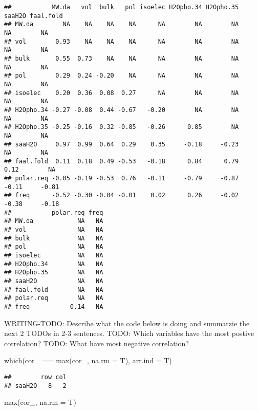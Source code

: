\documentclass[
]{book}
\newenvironment{Shaded}{\begin{snugshade}}{\end{snugshade}}
\newcommand{\AttributeTok}[1]{\textcolor[rgb]{0.77,0.63,0.00}{#1}}
\newcommand{\FunctionTok}[1]{\textcolor[rgb]{0.00,0.00,0.00}{#1}}
\newcommand{\NormalTok}[1]{#1}
\newcommand{\SpecialCharTok}[1]{\textcolor[rgb]{0.00,0.00,0.00}{#1}}
\begin{document}
\begin{verbatim}
##           MW.da   vol  bulk   pol isoelec H2Opho.34 H2Opho.35 saaH2O faal.fold
## MW.da        NA    NA    NA    NA      NA        NA        NA     NA        NA
## vol        0.93    NA    NA    NA      NA        NA        NA     NA        NA
## bulk       0.55  0.73    NA    NA      NA        NA        NA     NA        NA
## pol        0.29  0.24 -0.20    NA      NA        NA        NA     NA        NA
## isoelec    0.20  0.36  0.08  0.27      NA        NA        NA     NA        NA
## H2Opho.34 -0.27 -0.08  0.44 -0.67   -0.20        NA        NA     NA        NA
## H2Opho.35 -0.25 -0.16  0.32 -0.85   -0.26      0.85        NA     NA        NA
## saaH2O     0.97  0.99  0.64  0.29    0.35     -0.18     -0.23     NA        NA
## faal.fold  0.11  0.18  0.49 -0.53   -0.18      0.84      0.79   0.12        NA
## polar.req -0.05 -0.19 -0.53  0.76   -0.11     -0.79     -0.87  -0.11     -0.81
## freq      -0.52 -0.30 -0.04 -0.01    0.02      0.26     -0.02  -0.38     -0.18
##           polar.req freq
## MW.da            NA   NA
## vol              NA   NA
## bulk             NA   NA
## pol              NA   NA
## isoelec          NA   NA
## H2Opho.34        NA   NA
## H2Opho.35        NA   NA
## saaH2O           NA   NA
## faal.fold        NA   NA
## polar.req        NA   NA
## freq           0.14   NA
\end{verbatim}

WRITING-TODO: Describe what the code below is doing and summarzie the next 2 TODOs in 2-3 sentences.
TODO: Which variables have the most postive correlation?
TODO: What have most negative correlation?

\begin{Shaded}
\begin{Highlighting}[]
\FunctionTok{which}\NormalTok{(cor\_ }\SpecialCharTok{==} \FunctionTok{max}\NormalTok{(cor\_, }\AttributeTok{na.rm =}\NormalTok{ T), }\AttributeTok{arr.ind =}\NormalTok{ T)}
\end{Highlighting}
\end{Shaded}

\begin{verbatim}
##        row col
## saaH2O   8   2
\end{verbatim}

\begin{Shaded}
\begin{Highlighting}[]
\FunctionTok{max}\NormalTok{(cor\_, }\AttributeTok{na.rm =}\NormalTok{ T)}
\end{Highlighting}
\end{Shaded}
\end{document}
